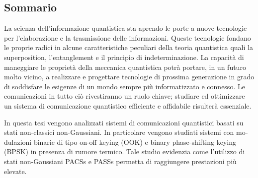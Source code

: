
\begin{otherlanguage}{italian}
\chapter*{Sommario}
    La scienza dell'informazione quantistica sta aprendo le porte a nuove tecnologie per l'elaborazione e 
    la trasmissione delle informazioni. Queste tecnologie fondano le proprie radici
    in alcune caratteristiche peculiari della teoria quantistica quali la \foreignlanguage{english}{
    superposition}, l'\foreignlanguage{english}{entanglement} e il principio di indeterminazione.
    La capacità di maneggiare le proprietà della meccanica quantistica potrà portare, 
    in un futuro molto vicino, a realizzare e progettare tecnologie di prossima generazione 
    in grado di soddisfare le esigenze di un mondo sempre
    più informatizzato e connesso.
    Le comunicazioni in tutto ciò rivestiranno un ruolo chiave; studiare ed ottimizzare un sistema
    di comunicazione quantistico efficiente e affidabile risulterà essenziale.

    In questa tesi vengono analizzati sistemi di comunicazioni quantistici basati su stati non-classici 
    non-Gaussiani. In particolare vengono studiati sistemi con modulazioni binarie di tipo on-off 
    keying (OOK) e binary phase-shifting keying (BPSK) in presenza di rumore termico. Tale studio 
    evidenzia come l'utilizzo di stati non-Gaussiani PACSs e PASSs permetta di raggiungere prestazioni
    più elevate.
\end{otherlanguage}